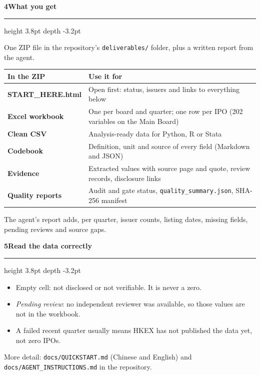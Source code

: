 \documentclass[11pt,a4paper]{article}
\newcommand{\step}[2]{\par\vspace{6pt}%
  {\color{accent}\large\bfseries #1\enspace #2}\enspace
  {\color{accent!30}\leaders\hrule height 3.8pt depth -3.2pt\hfill\kern0pt}\par\vspace{2pt}}
\begin{document}
\step{4}{What you get}
One ZIP file in the repository's \texttt{deliverables/} folder, plus a written report from the agent.

\begin{tabularx}{\linewidth}{@{}>{\bfseries}p{40mm}X@{}}
\toprule
In the ZIP & Use it for \\
\midrule
START\_HERE.html & Open first: status, issuers and links to everything below \\
Excel workbook & One per board and quarter; one row per IPO (202 variables on the Main Board) \\
Clean CSV & Analysis-ready data for Python, R or Stata \\
Codebook & Definition, unit and source of every field (Markdown and JSON) \\
Evidence & Extracted values with source page and quote, review records, disclosure links \\
Quality reports & Audit and gate status, \texttt{quality\_summary.json}, SHA-256 manifest \\
\bottomrule
\end{tabularx}

The agent's report adds, per quarter, issuer counts, listing dates, missing fields,
pending reviews and source gaps.

\step{5}{Read the data correctly}
\begin{itemize}
\item Empty cell: not disclosed or not verifiable. It is never a zero.
\item \emph{Pending review}: no independent reviewer was available, so those values are not in the workbook.
\item A failed recent quarter usually means HKEX has not published the data yet, not zero IPOs.
\end{itemize}

\vfill
{\small\color{note}More detail: \texttt{docs/QUICKSTART.md} (Chinese and English)
and \texttt{docs/AGENT\_INSTRUCTIONS.md} in the repository.}
\end{document}
